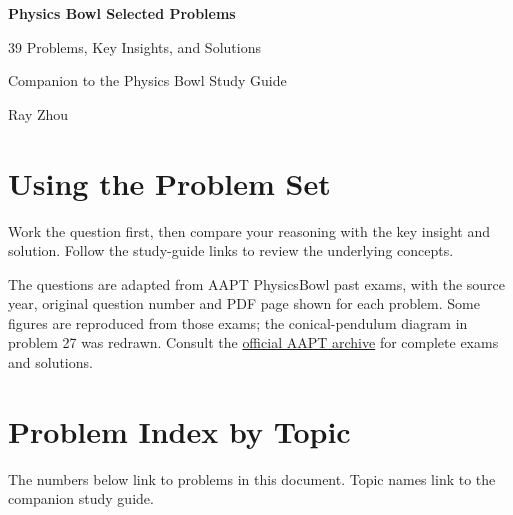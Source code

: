 \documentclass[12pt,a4paper]{article}
\begin{document}
\hypersetup{pageanchor=false}
\begin{titlepage}
\thispagestyle{empty}
\centering
\vspace*{2.2cm}
{\Huge\bfseries Physics Bowl Selected Problems\par}
\vspace{0.7cm}
{\Large 39 Problems, Key Insights, and Solutions\par}
\vspace{0.5cm}
{\large Companion to the Physics Bowl Study Guide\par}
\vfill
{\large Ray Zhou\par}
\end{titlepage}
\hypersetup{pageanchor=true}
\pagestyle{plain}
\section*{Using the Problem Set}
Work the question first, then compare your reasoning with the key insight and solution. Follow the study-guide links to review the underlying concepts.

The questions are adapted from AAPT PhysicsBowl past exams, with the source year, original question number and PDF page shown for each problem. Some figures are reproduced from those exams; the conical-pendulum diagram in problem 27 was redrawn. Consult the \href{https://www.aapt.org/Programs/PhysicsBowl/printexams.cfm}{official AAPT archive} for complete exams and solutions.


\section*{Problem Index by Topic}
The numbers below link to problems in this document. Topic names link to the companion study guide.
\ProblemTopicIndex

\clearpage
{}
\pagestyle{fancy}
\begin{enumerate}[itemsep=1.2em, topsep=0.6em]




\end{enumerate}
\end{document}
